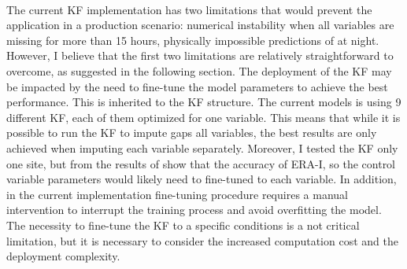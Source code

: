 \documentclass{article}
\begin{document}
\paragraph{} The current KF implementation has two limitations that would prevent the application in a production scenario: numerical instability when all variables are missing for more than 15 hours, physically impossible predictions of  at night. However, I believe that the first two limitations are relatively straightforward to overcome, as suggested in the following section. The deployment of the KF may be impacted by the need to fine-tune the model parameters to achieve the best performance. This is inherited to the KF structure.
The current models is using 9 different KF, each of them optimized for one variable. This means that while it is possible to run the KF to impute gaps all variables, the best results are only achieved when imputing each variable separately. Moreover, I tested the KF only one site, but from the results of \cite{vuichard_filling_2015} show that the accuracy of ERA-I, so the control variable parameters would likely need to fine-tuned to each variable. In addition, in the current implementation fine-tuning procedure requires a manual intervention to interrupt the training process and avoid overfitting the model.
The necessity to fine-tune the KF to a specific conditions is a not critical limitation, but it is necessary to consider the increased computation cost and the deployment complexity. 


\end{document}
